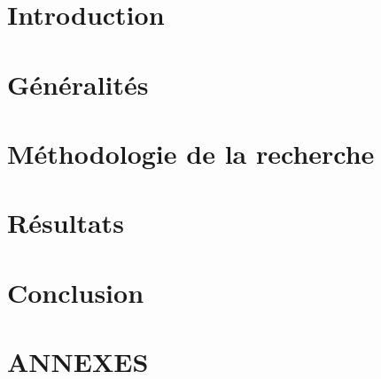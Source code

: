 \documentclass[french]{amu_these}
\begin{document}
	\ohead{\leftmark\ifstr{\rightmark}{\leftmark}{}{ -- \rightmark}}	%

	\chapter*{Introduction}
	

	\chapter{ Généralités}
	

	\chapter{ Méthodologie de la recherche}
	

	\chapter{ Résultats}
	

	\chapter*{Conclusion}
	

	\appendix

	\newpage
	\printbibliography[					%
	heading=bibintoc
	]	
	\newpage
	\printindex							%
	\newpage
	\printendnotes						%

	\setcounter{chapter}{0}
	\renewcommand{\thesection}{\Alph{section}}
	
	\chapter*{ANNEXES}
	\newpage
	
	
	\newpage
	
\end{document}
